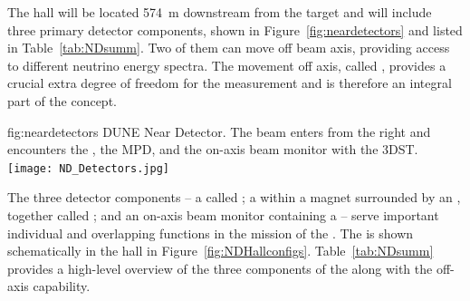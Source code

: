 The  hall will be located \SI{574}{m} downstream from the target and will include three primary detector components, shown in Figure~\ref{fig:neardetectors}  and listed in Table~\ref{tab:NDsumm}. Two of them can move off beam axis, providing access to different neutrino energy spectra. The movement off axis, called , provides a crucial extra degree of freedom for the  measurement and is therefore an integral part of the   concept. 


\begin{dunefigure}
{fig:neardetectors}
{DUNE Near Detector. The beam enters from the right and encounters
the , the MPD, and the on-axis beam monitor with the 3DST.}
\texttt{[image: ND\_Detectors.jpg]}
\end{dunefigure}

The three detector components -- a  called ; a  within a magnet surrounded by an , together called ; and an on-axis beam monitor containing a  -- serve important individual and overlapping functions in the mission of the . 
The   is shown schematically in the   hall in Figure~\ref{fig:NDHallconfigs}.  
Table~\ref{tab:NDsumm} provides a high-level overview of the three components of the   along with the off-axis capability.  

